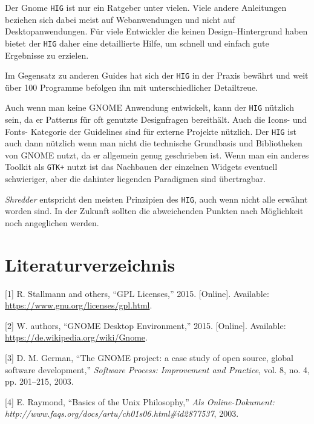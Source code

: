 \documentclass[11pt,ngerman,toc=listof,index=totoc]{scrreprt}
\begin{document}
Der Gnome \texttt{HIG} ist nur ein Ratgeber unter vielen. Viele andere
Anleitungen beziehen sich dabei meist auf Webanwendungen und nicht auf
Desktopanwendungen. Für viele Entwickler die keinen Design--Hintergrund
haben bietet der \texttt{HIG} daher eine detaillierte Hilfe, um schnell
und einfach gute Ergebnisse zu erzielen.

Im Gegensatz zu anderen Guides hat sich der \texttt{HIG} in der Praxis
bewährt und weit über 100 Programme befolgen ihn mit unterschiedlicher
Detailtreue.

Auch wenn man keine GNOME Anwendung entwickelt, kann der \texttt{HIG}
nützlich sein, da er Patterns für oft genutzte Designfragen bereithält.
Auch die Icons- und Fonts- Kategorie der Guidelines sind für externe
Projekte nützlich. Der \texttt{HIG} ist auch dann nützlich wenn man
nicht die technische Grundbasis und Bibliotheken von GNOME nutzt, da er
allgemein genug geschrieben ist. Wenn man ein anderes Toolkit als
\texttt{GTK+} nutzt ist das Nachbauen der einzelnen Widgets eventuell
schwieriger, aber die dahinter liegenden Paradigmen sind übertragbar.

\emph{Shredder} entspricht den meisten Prinzipien des \texttt{HIG}, auch
wenn nicht alle erwähnt worden sind. In der Zukunft sollten die
abweichenden Punkten nach Möglichkeit noch angeglichen werden.

\newpage

\chapter*{Literaturverzeichnis}\label{literaturverzeichnis}

\hypertarget{refs}{}
\hypertarget{ref-gpl}{}
{[}1{]} R. Stallmann and others, ``GPL Licenses,'' 2015. {[}Online{]}.
Available: \url{https://www.gnu.org/licenses/gpl.html}.

\hypertarget{ref-wikiux5fgnome}{}
{[}2{]} W. authors, ``GNOME Desktop Environment,'' 2015. {[}Online{]}.
Available: \url{https://de.wikipedia.org/wiki/Gnome}.

\hypertarget{ref-german2003gnome}{}
{[}3{]} D. M. German, ``The GNOME project: a case study of open source,
global software development,'' \emph{Software Process: Improvement and
Practice}, vol. 8, no. 4, pp. 201--215, 2003.

\hypertarget{ref-raymond2003basics}{}
{[}4{]} E. Raymond, ``Basics of the Unix Philosophy,'' \emph{Als
Online-Dokument: http://www.faqs.org/docs/artu/ch01s06.html\#id2877537},
2003.
\end{document}
